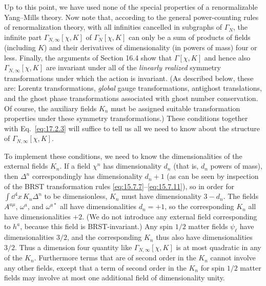Up to this point, we have used none of the special properties of a renormalizable Yang--Mills theory. Now note that, according to the general power-counting rules of renormalization theory, with all infinities cancelled in subgraphs of $\Gamma_N$, the infinite part $\Gamma_{N,\infty}[\chi,K]$ of $\Gamma_N[\chi,K]$ can only be a sum of products of fields (including $K$) and their derivatives of dimensionality (in powers of mass) four or less. Finally, the arguments of Section 16.4 show that $\Gamma[\chi,K]$ and hence also $\Gamma_{N,\infty}[\chi,K]$ are invariant under all of the \emph{linearly realized} symmetry transformations under which the action is invariant. (As described below, these are: Lorentz transformations, \emph{global} gauge transformations, antighost translations, and the ghost phase transformations associated with ghost number conservation. Of course, the auxiliary fields $K_n$ must be assigned suitable transformation properties under these symmetry transformations.) These conditions together with Eq.~\eqref{eq:17.2.3} will suffice to tell us all we need to know about the structure of $\Gamma_{N,\infty}[\chi,K]$.

To implement these conditions, we need to know the dimensionalities of the external fields $K_n$. If a field $\chi^n$ has dimensionality $d_n$ (that is, $d_n$ powers of mass), then $\Delta^n$ correspondingly has dimensionality $d_n+1$ (as can be seen by inspection of the BRST transformation rules \eqref{eq:15.7.7}--\eqref{eq:15.7.11}), so in order for $\int \dd^4x\,K_n\Delta^n$ to be dimensionless, $K_n$ must have dimensionality $3-d_n$. The fields $A^{a\mu}$, $\omega^a$, and $\omega^{a *}$ all have dimensionalities $d_n=+1$, so the corresponding $K_n$ all have dimensionalities $+2$. (We do not introduce any external field corresponding to $h^a$, because this field is BRST-invariant.) Any spin $1/2$ matter fields $\psi_\ell$ have dimensionalities $3/2$, and the corresponding $K_n$ thus also have dimensionalities $3/2$. Thus a dimension four quantity like $\Gamma_{N,\infty}[\chi,K]$ is at most quadratic in any of the $K_n$. Furthermore terms that are of second order in the $K_n$ cannot involve any other fields, except that a term of second order in the $K_n$ for spin $1/2$ matter fields may involve at most one additional field of dimensionality unity.

